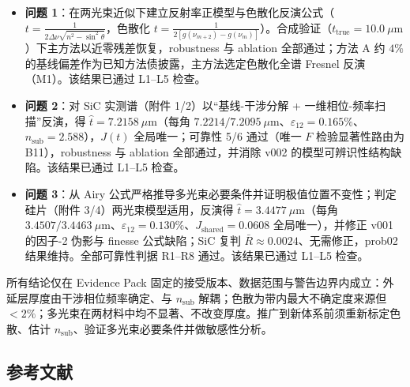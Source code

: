 \begin{itemize}
\tightlist
\item
  \textbf{问题
  1}：在两光束近似下建立反射率正模型与色散化反演公式（\(t=\frac{1}{2\Delta\nu\sqrt{n^2-\sin^2\theta}}\)，色散化
  \(t=\frac{1}{2[g(\nu_{m+2})-g(\nu_m)]}\)）。合成验证（\(t_{\mathrm{true}}=10.0\ \mu\mathrm{m}\)）下主方法以近零残差恢复，robustness
  与 ablation 全部通过；方法 A 约 \(4\%\)
  的基线偏差作为已知方法债披露，主方法选定色散化全谱 Fresnel
  反演（M1）。该结果已通过 L1--L5 检查。
\item
  \textbf{问题 2}：对 SiC 实测谱（附件 1/2）以``基线-干涉分解 +
  一维相位-频率扫描''反演，得 \(\hat t=7.2158\ \mu\mathrm{m}\)（每角
  \(7.2214/7.2095\ \mu\mathrm{m}\)、\(\varepsilon_{12}=0.165\%\)、\(\hat n_{\mathrm{sub}}=2.588\)），\(J(t)\)
  全局唯一；可靠性 5/6 通过（唯一 \(F\) 检验显著性路由为
  B11），robustness 与 ablation 全部通过，并消除 v002
  的模型可辨识性结构缺陷。该结果已通过 L1--L5 检查。
\item
  \textbf{问题 3}：从 Airy
  公式严格推导多光束必要条件并证明极值位置不变性；判定硅片（附件
  3/4）两光束模型适用，反演得 \(\hat t=3.4477\ \mu\mathrm{m}\)（每角
  \(3.4507/3.4463\ \mu\mathrm{m}\)、\(\varepsilon_{12}=0.130\%\)、\(J_{\mathrm{shared}}=0.0608\)
  全局唯一），并修正 v001 的因子-2 伪影与 finesse 公式缺陷；SiC 复判
  \(\bar R\approx0.0024\)、无需修正，prob02 结果维持。全部可靠性判据
  R1--R8 通过。该结果已通过 L1--L5 检查。
\end{itemize}

所有结论仅在 Evidence Pack
固定的接受版本、数据范围与警告边界内成立：外延层厚度由干涉相位频率确定、与
\(n_{\mathrm{sub}}\) 解耦；色散为带内最大不确定度来源但
\(<2\%\)；多光束在两材料中均不显著、不改变厚度。推广到新体系前须重新标定色散、估计
\(n_{\mathrm{sub}}\)、验证多光束必要条件并做敏感性分析。

\subsection{参考文献}\label{ux53c2ux8003ux6587ux732e}

